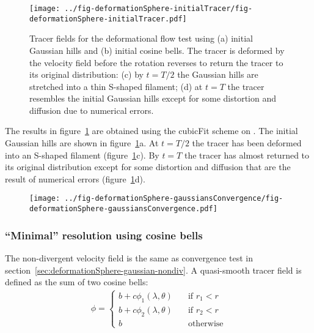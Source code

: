 \begin{figure}
	\centering
	\texttt{[image: ../fig-deformationSphere-initialTracer/fig-deformationSphere-initialTracer.pdf]}
	\caption{Tracer fields for the deformational flow test using (a) initial Gaussian hills and (b) initial cosine bells.  The tracer is deformed by the velocity field before the rotation reverses to return the tracer to its original distribution: (c) by $t=T/2$ the Gaussian hills are stretched into a thin S-shaped filament; (d) at $t=T$ the tracer resembles the initial Gaussian hills except for some distortion and diffusion due to numerical errors.
	\\
	}
	\label{fig:deformationSphere-evolution}
\end{figure}

The results in figure~\ref{fig:deformationSphere-evolution} are obtained using the cubicFit scheme on .  The initial Gaussian hills are shown in figure~\ref{fig:deformationSphere-evolution}a.  At $t=T/2$ the tracer has been deformed into an S-shaped filament (figure~\ref{fig:deformationSphere-evolution}c).  By $t=T$ the tracer has almost returned to its original distribution except for some distortion and diffusion that are the result of numerical errors (figure~\ref{fig:deformationSphere-evolution}d).

\begin{figure}
	\centering
	\texttt{[image: ../fig-deformationSphere-gaussiansConvergence/fig-deformationSphere-gaussiansConvergence.pdf]}
	\caption{}
\end{figure}

\subsubsection{``Minimal'' resolution using cosine bells}

The non-divergent velocity field is the same as convergence test in section~\ref{sec:deformationSphere-gaussian-nondiv}.  A quasi-smooth tracer field is defined as the sum of two cosine bells:
\begin{align}
	\phi =
	\begin{cases}
		b + c \phi_1(\lambda, \theta) & \quad \text{if $r_1 < r$} \\
		b + c \phi_2(\lambda, \theta) & \quad \text{if $r_2 < r$} \\
		b			      & \quad \text{otherwise}
	\end{cases}
\end{align}

